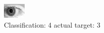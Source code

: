 \begin{figure}[h!]
\begin{center}
\includegraphics[width=0.60\columnwidth]{figures/ID205_class_4_target_3.png}
\end{center}
\caption{ Classification: 4 actual target: 3}
\label{fig:ID205_class_4_target_3}
\end{figure}
